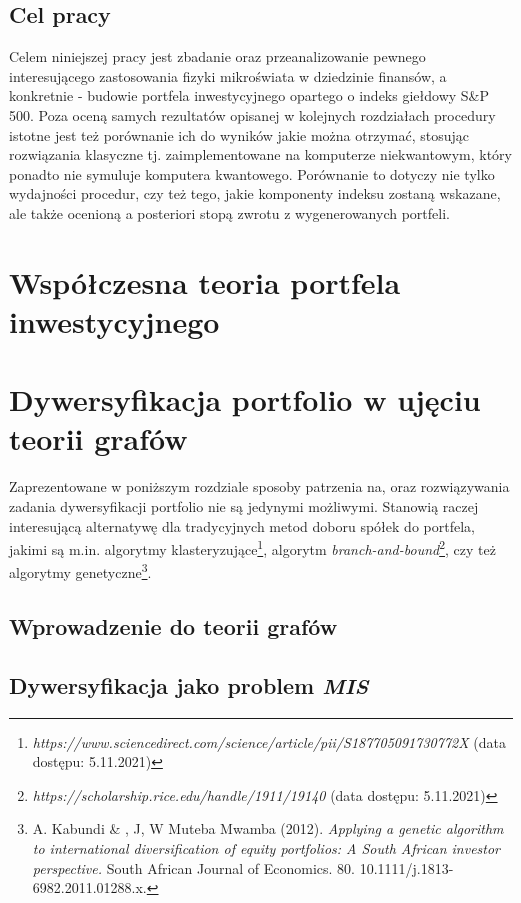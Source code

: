 \documentclass[12pt,a4paper,twoside,openany]{book}
\begin{document}
\section{Cel pracy}
Celem niniejszej pracy jest zbadanie oraz przeanalizowanie pewnego interesującego zastosowania fizyki mikroświata w dziedzinie finansów, a konkretnie - budowie portfela inwestycyjnego opartego o indeks giełdowy S\&P 500. Poza oceną samych rezultatów opisanej w kolejnych rozdziałach procedury istotne jest też porównanie ich do wyników jakie można otrzymać, stosując rozwiązania klasyczne tj. zaimplementowane na komputerze niekwantowym, który ponadto nie symuluje komputera kwantowego. Porównanie to dotyczy nie tylko wydajności procedur, czy też tego, jakie komponenty indeksu zostaną wskazane, ale także ocenioną a posteriori stopą zwrotu z wygenerowanych portfeli.

\chapter{Współczesna teoria portfela inwestycyjnego}

\chapter{Dywersyfikacja portfolio w ujęciu teorii grafów}
Zaprezentowane w poniższym rozdziale sposoby patrzenia na, oraz rozwiązywania zadania dywersyfikacji portfolio nie są jedynymi możliwymi. Stanowią raczej interesującą alternatywę dla tradycyjnych metod doboru spółek do portfela, jakimi są m.in. algorytmy klasteryzujące\footnote{\textit{https://www.sciencedirect.com/science/article/pii/S187705091730772X} (data dostępu: 5.11.2021)}, algorytm \textit{branch-and-bound}\footnote{\textit{https://scholarship.rice.edu/handle/1911/19140} (data dostępu: 5.11.2021)}, czy też algorytmy genetyczne\footnote{A. Kabundi \& , J, W Muteba Mwamba (2012). \textit{Applying a genetic algorithm to international diversification of equity portfolios: A South African investor perspective.} South African Journal of Economics. 80. 10.1111/j.1813-6982.2011.01288.x.}.

\section{Wprowadzenie do teorii grafów}

\section{Dywersyfikacja jako problem \textit{MIS}}
\end{document}
